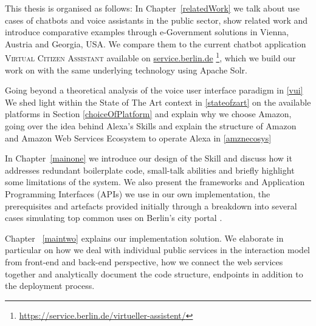 This thesis is organised as follows:
In Chapter~\ref{relatedWork} %
we talk about use cases of chatbots and voice assistants in the public sector, 
show related work 
and introduce comparative examples
through e-Government solutions in
Vienna, Austria and Georgia, USA.
We compare them to the current chatbot application \textsc{Virtual Citizen Assistant} available on \href{https://service.berlin.de/virtueller-assistent/virtueller-assistent-606279.php}{service.berlin.de} \footnote{\url{https://service.berlin.de/virtueller-assistent/}}, which we build our work on with the same underlying technology using Apache Solr.

%

Going beyond a theoretical analysis of the voice user interface paradigm in 
 \ref{vui}
We shed light within the State of The Art context in 
 \ref{stateofzart} 
on the available platforms in Section \ref{choiceOfPlatform} and explain why we choose Amazon, going over the idea behind Alexa's Skills
and explain the structure of Amazon and Amazon Web Services Ecosystem to operate Alexa in  \ref{amznecosys}

%
%
%
%
%


In Chapter~\ref{mainone} we introduce our design of the Skill and discuss how it 
addresses
redundant boilerplate code, small-talk abilities and briefly highlight some limitations of the system. We also present the frameworks and Application Programming Interfaces (APIs) we use in our own implementation, the prerequisites and artefacts provided initially through a breakdown into several cases simulating top common uses on Berlin's city portal .


Chapter ~\ref{maintwo} 
explains our implementation solution. We elaborate in particular on how we deal with individual public services in the interaction model from front-end and back-end perspective, how we connect the web services together and analytically document the code structure, endpoints in addition to the deployment process.

